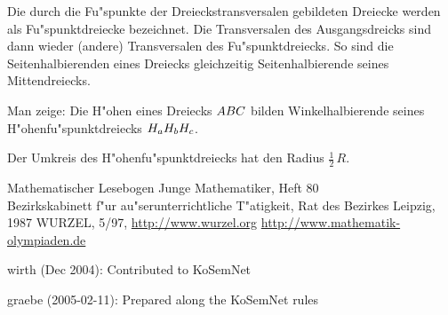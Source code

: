 \documentclass[11pt,a4paper]{article}
\begin{document}
\begin{aufgabe}
  Die durch die Fu"spunkte der Dreieckstransversalen gebildeten Dreiecke
  werden als Fu"spunktdreiecke bezeichnet. Die Transversalen des
  Ausgangsdreicks sind dann wieder (andere) Transversalen des
  Fu"spunktdreiecks. So sind die Seitenhalbierenden eines Dreiecks
  gleichzeitig Seitenhalbierende seines Mittendreiecks.
  
  Man zeige: Die H"ohen eines Dreiecks $\ktriangle*{ABC}$ bilden
  Winkelhalbierende seines H"ohenfu"spunktdreiecks $\ktriangle*{H_aH_bH_c}$.
\end{aufgabe}
\begin{aufgabe}
  Der Umkreis des H"ohenfu"spunktdreiecks hat den Radius $\frac12\,R$.
\end{aufgabe}
\begin{thebibliography}{99}
 Mathematischer Lesebogen {\glqq}Junge Mathematiker{\grqq},
  Heft 80\\ Bezirkskabinett f"ur au"serunterrichtliche T"atigkeit, Rat des
  Bezirkes Leipzig, 1987
 WURZEL, 5/97, \url{http://www.wurzel.org}
 \url{http://www.mathematik-olympiaden.de}
\end{thebibliography}

\begin{comment}
  to do: convert pictures
\end{comment}

\begin{attribution}
wirth (Dec 2004): Contributed to KoSemNet

graebe (2005-02-11): Prepared along the KoSemNet rules
\end{attribution}
\end{document}
